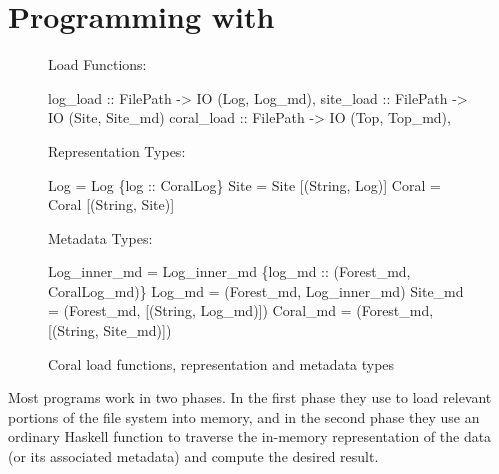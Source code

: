 \section{Programming with \forest{}}
\label{sec:exp}

\begin{figure}
Load Functions:
\begin{code}
log_load   :: FilePath -> IO (Log, Log_md),
site_load  :: FilePath -> IO (Site, Site_md)
coral_load :: FilePath -> IO (Top, Top_md),
\end{code}
%
Representation Types:
\begin{code}
    Log   = Log   \{log :: CoralLog\}
 Site  = Site  [(String, Log)]
 Coral = Coral [(String, Site)]
\end{code}
%
Metadata Types:
\begin{code}
 Log_inner_md = 
  Log_inner_md \{log_md :: (Forest_md, CoralLog_md)\}
 Log_md   = (Forest_md, Log_inner_md)
 Site_md  = (Forest_md, [(String, Log_md)])
 Coral_md = (Forest_md, [(String, Site_md)])
\end{code}
\caption{Coral load functions, representation and metadata types}
\label{fig:coral-aux}
\end{figure}

Most \forest{} programs work in two phases. In the first phase they
use \forest{} to load relevant portions of the file system into memory,
and in the second phase they use an ordinary Haskell function to
traverse the in-memory representation of the data (or its associated
metadata) and compute the desired result.


